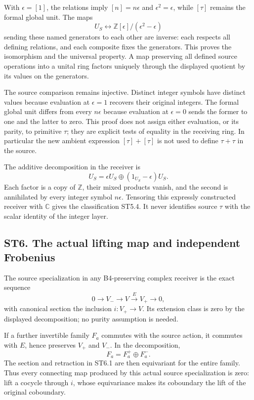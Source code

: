 With \(\epsilon=[1]\), the relations imply \([n]=n\epsilon\) and
\(\epsilon^2=\epsilon\), while \([\tau]\) remains the formal global
unit. The maps \[
 U_S\longleftrightarrow\mathbb Z[\epsilon]/(\epsilon^2-\epsilon)
\tag{ST5.6}
\] sending these named generators to each other are inverse: each
respects all defining relations, and each composite fixes the
generators. This proves the isomorphism and the universal property. A
map preserving all defined source operations into a unital ring factors
uniquely through the displayed quotient by its values on the generators.

The source comparison remains injective. Distinct integer symbols have
distinct values because evaluation at \(\epsilon=1\) recovers their
original integers. The formal global unit differs from every
\(n\epsilon\) because evaluation at \(\epsilon=0\) sends the former to
one and the latter to zero. This proof does not assign either
evaluation, or its parity, to primitive \(\tau\); they are explicit
tests of equality in the receiving ring. In particular the new ambient
expression \([\tau]+[\tau]\) is not used to define \(\tau+\tau\) in the
source.

The additive decomposition in the receiver is \[
 U_S=\epsilon U_S\oplus(1_{U_S}-\epsilon)U_S.
\tag{ST5.7}
\] Each factor is a copy of \(\mathbb Z\), their mixed products vanish,
and the second is annihilated by every integer symbol \(n\epsilon\).
Tensoring this expressly constructed receiver with \(\mathbb C\) gives
the classification ST5.4. It never identifies source \(\tau\) with the
scalar identity of the integer layer.

\subsection{ST6. The actual lifting map and independent
Frobenius}\label{st6.-the-actual-lifting-map-and-independent-frobenius}

The source specialization in any B4-preserving complex receiver is the
exact sequence \[
 0\longrightarrow V_-\longrightarrow V
 \xrightarrow{E}V_+\longrightarrow0,
\tag{ST6.1}
\] with canonical section the inclusion \(i:V_+\to V\). Its extension
class is zero by the displayed decomposition; no purity assumption is
needed.

If a further invertible family \(F_a\) commutes with the source action,
it commutes with \(E\), hence preserves \(V_+\) and \(V_-\). In the
decomposition, \[
 F_a=F_a^+\oplus F_a^-.
\tag{ST6.2}
\] The section and retraction in ST6.1 are then equivariant for the
entire family. Thus every connecting map produced by this actual source
specialization is zero: lift a cocycle through \(i\), whose equivariance
makes its coboundary the lift of the original coboundary.

